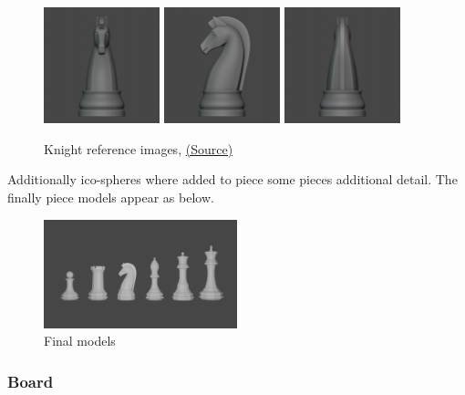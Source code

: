 \documentclass[11pt]{article}
\begin{document}
\begin{figure}[htbp]
\begin{center}
\includegraphics[width=0.3\textwidth]{ref/knight front.jpg}
\includegraphics[width=0.3\textwidth]{ref/knight right.jpg}
\includegraphics[width=0.3\textwidth]{ref/knight back.jpg}
\end{center}
\caption{Knight reference images, \href{https://imgur.com/a/Pg9WYII}{(Source)}}
\end{figure}

Additionally ico-spheres where added  to piece some pieces additional detail.
The finally piece models appear as below.
\begin{figure}[htbp]
\centering
\includegraphics[width=0.5\textwidth]{Images/Pieces.png}
\caption{Final models}
\end{figure}
\newpage


\subsubsection{Board}
\label{sec:org9a78a03}
\end{document}
